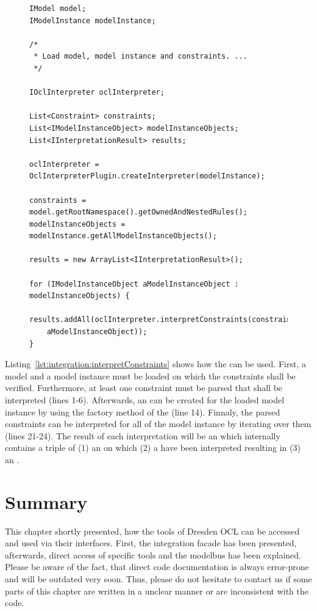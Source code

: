\begin{figure}[!b]
\begin{lstlisting}[caption={How to interpret constraints.}, captionpos=b, label=lst:integration:interpretConstraints]
IModel model;
IModelInstance modelInstance;

/*
 * Load model, model instance and constraints. ...
 */

IOclInterpreter oclInterpreter;

List<Constraint> constraints;
List<IModelInstanceObject> modelInstanceObjects;
List<IInterpretationResult> results;

oclInterpreter = OclInterpreterPlugin.createInterpreter(modelInstance);

constraints = model.getRootNamespace().getOwnedAndNestedRules();
modelInstanceObjects = modelInstance.getAllModelInstanceObjects();

results = new ArrayList<IInterpretationResult>();

for (IModelInstanceObject aModelInstanceObject : modelInstanceObjects) {
  results.addAll(oclInterpreter.interpretConstraints(constraints,
  	aModelInstanceObject));
}
\end{lstlisting}
\end{figure}

Listing~\ref{lst:integration:interpretConstraints} shows how the 
 can be used. First, a model and a model instance must be 
loaded on which the constraints shall be verified. Furthermore, at least one 
constraint must be parsed that shall be interpreted (lines 1-6). Afterwards, an
 can be created for the loaded model instance by using 
the factory method of the  (line 14). Finnaly, the 
parsed constraints can be interpreted for all  of 
the model instance by iterating over them (lines 21-24). The result of each 
interpretation will be an  which internally contains
a triple of (1) an  on which (2) a  
have been interpreted resulting in (3) an .



\section{Summary}

This chapter shortly presented, how the tools of Dresden OCL can be accessed and
used via their interfaces. First, the integration facade has been presented, 
afterwards, direct access of specific tools and the modelbus has been explained.
Please be aware of the fact, that direct code documentation is always 
error-prone and will be outdated very soon. Thus, please do not hesitate to 
contact us if some parts of this chapter are written in a unclear manner or are 
inconsistent with the code.
